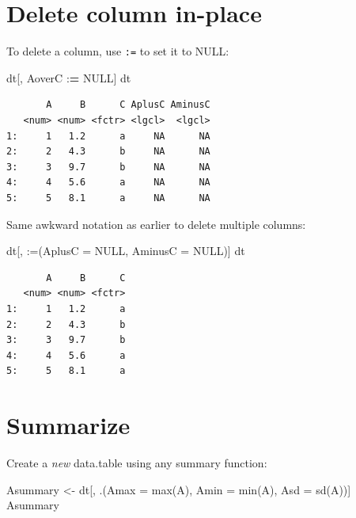 \documentclass[
]{book}
\newenvironment{Shaded}{\begin{snugshade}}{\end{snugshade}}
\newcommand{\AttributeTok}[1]{\textcolor[rgb]{0.77,0.63,0.00}{#1}}
\newcommand{\ConstantTok}[1]{\textcolor[rgb]{0.00,0.00,0.00}{#1}}
\newcommand{\ErrorTok}[1]{\textcolor[rgb]{0.64,0.00,0.00}{\textbf{#1}}}
\newcommand{\FunctionTok}[1]{\textcolor[rgb]{0.00,0.00,0.00}{#1}}
\newcommand{\NormalTok}[1]{#1}
\newcommand{\OtherTok}[1]{\textcolor[rgb]{0.56,0.35,0.01}{#1}}
\newcommand{\SpecialCharTok}[1]{\textcolor[rgb]{0.00,0.00,0.00}{#1}}
\newcommand{\StringTok}[1]{\textcolor[rgb]{0.31,0.60,0.02}{#1}}
\begin{document}
\hypertarget{delete-column-in-place}{%
\section{Delete column in-place}\label{delete-column-in-place}}

To delete a column, use \texttt{:=} to set it to NULL:

\begin{Shaded}
\begin{Highlighting}[]
\NormalTok{dt[, AoverC }\SpecialCharTok{:}\ErrorTok{=} \ConstantTok{NULL}\NormalTok{]}
\NormalTok{dt}
\end{Highlighting}
\end{Shaded}

\begin{verbatim}
       A     B      C AplusC AminusC
   <num> <num> <fctr> <lgcl>  <lgcl>
1:     1   1.2      a     NA      NA
2:     2   4.3      b     NA      NA
3:     3   9.7      b     NA      NA
4:     4   5.6      a     NA      NA
5:     5   8.1      a     NA      NA
\end{verbatim}

Same awkward notation as earlier to delete multiple columns:

\begin{Shaded}
\begin{Highlighting}[]
\NormalTok{dt[, }\StringTok{\textasciigrave{}}\AttributeTok{:=}\StringTok{\textasciigrave{}}\NormalTok{(}\AttributeTok{AplusC =} \ConstantTok{NULL}\NormalTok{, }\AttributeTok{AminusC =} \ConstantTok{NULL}\NormalTok{)]}
\NormalTok{dt}
\end{Highlighting}
\end{Shaded}

\begin{verbatim}
       A     B      C
   <num> <num> <fctr>
1:     1   1.2      a
2:     2   4.3      b
3:     3   9.7      b
4:     4   5.6      a
5:     5   8.1      a
\end{verbatim}

\hypertarget{summarize-2}{%
\section{Summarize}\label{summarize-2}}

Create a \emph{new} data.table using any summary function:

\begin{Shaded}
\begin{Highlighting}[]
\NormalTok{Asummary }\OtherTok{\textless{}{-}}\NormalTok{ dt[, .(}\AttributeTok{Amax =} \FunctionTok{max}\NormalTok{(A), }\AttributeTok{Amin =} \FunctionTok{min}\NormalTok{(A), }\AttributeTok{Asd =} \FunctionTok{sd}\NormalTok{(A))]}
\NormalTok{Asummary}
\end{Highlighting}
\end{Shaded}
\end{document}
